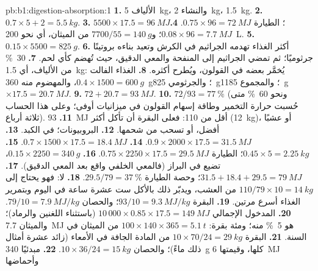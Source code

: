 \begin{solution}{pb:b1:digestion-absorption:1}
\textbf{1.} الألياف \qty{5}{kg}، والنشاء  \qty{2}{kg}،
 \qty{1.5}{kg}.
\textbf{2.} $0.7\times 5 + 2 = \qty{5.5}{kg}$.
\textbf{3.} $5500\times 17.5 = \qty{96}{MJ}$؛ 
الطيارة $0.75\times 96 =
\qty{72}{MJ}$.
\textbf{4.} $0.08\times 96 = \qty{7.7}{MJ}$؛ و$7700/55 = \qty{140}{g}$
من الميثان، أي نحو \qty{200}{L}.
\textbf{5.} $0.15\times 5500 = \qty{825}{g}$.
\textbf{6.} أكثر  الغذاء تهدمه الجراثيم في الكرش وتعيد بناءه
بروتينًا جرثوميًا؛ ثم تمضي الجراثيم إلى المنفحة والمعي الدقيق،
حيث تُهضم كأي لحم.
\textbf{7.} \qty{30}{\%} من الألياف، أي \qty{1.5}{kg}: يُخمَّر
بعضه في القولون، ويُطرح أكثره.
\textbf{8.}  الغذاء الفالت $0.4\times 1500 = \qty{600}{g}$،
والمهضوم منه \qty{360}{g}؛ والجرثومي \qty{825}{g}؛ والمجموع
\qty{1185}{g} $\times 17.5 = \qty{20.7}{MJ}$.
\textbf{9.} $72 + 20.7 = \qty{93}{MJ}$.
\textbf{10.} $72/93 = \qty{77}{\%}$ (ونحو \qty{60}{\%} متى حُسبت
حرارة التخمير وطاقة إسهام القولون في ميزانيات أوفى؛ وعلى هذا
الحساب ثلاثة أرباع).
\textbf{11.} \qty{93}{MJ} أقل من \qty{110}{}: فعلى البقرة أن تأكل
أكثر (\qty{12}{kg})، أو عشبًا أفضل، أو تسحب من شحمها.
\textbf{12.} البروبيونات؛  في الكبد.
\textbf{13.} $0.9\times 2000\times 17.5 = \qty{31.5}{MJ}$.
\textbf{14.} $0.7\times 1500\times 17.5 = \qty{18.4}{MJ}$.
\textbf{15.} $0.45\times 5 = \qty{2.25}{kg}$؛ 
الطيارة $0.75\times 2250\times
17.5 = \qty{29.5}{MJ}$.
\textbf{16.} $0.15\times 2250 = \qty{340}{g}$، تضيع في البراز (فالمعي
الخلفي واقع بعد المعي الدقيق).
\textbf{17.} $31.5 + 18.4 + 29.5 = \qty{79}{MJ}$؛ وحصة  الطيارة $29.5/79 =
\qty{37}{\%}$.
\textbf{18.} لا: فهو يحتاج إلى $110/79\times 10 = \qty{14}{kg}$ من
العشب، ويدبّر ذلك بالأكل ست عشرة ساعة في اليوم وبتمرير الغذاء أسرع
مرتين.
\textbf{19.} البقرة $93/10 = \qty{9.3}{MJ/kg}$؛ والحصان $79/10 =
\qty{7.9}{MJ/kg}$.
\textbf{20.} المدخول الإجمالي $10\,000\times 0.85\times 17.5 =
\qty{149}{MJ}$ (باستثناء اللغنين والرماد)؛ والميثان \qty{7.7}{MJ}
هو \qty{5}{\%} منه؛ ومئة بقرة: $100\times 140\times 365 =
\qty{5.1}{t}$ من الميثان في السنة.
\textbf{21.} البقرة $10\times 70/24 = \qty{29}{kg}$ من المادة الجافة
في الأمعاء (زائد عشرة أمثال ذلك ماءً)؛ والحصان $10\times 36/24 =
\qty{15}{kg}$.
\textbf{22.} مبدئيًا \qty{340}{g} كلها، وقيمتها \qty{6}{MJ} وأحماضها

\end{solution}
